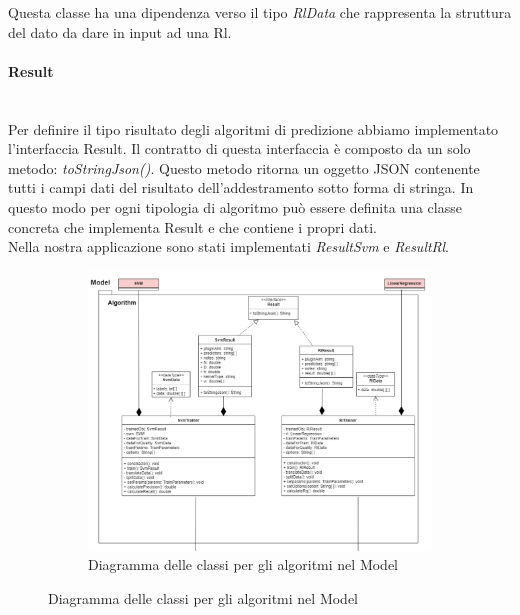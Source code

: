 		Questa classe ha una dipendenza verso il tipo \textit{RlData} che rappresenta la struttura del dato da dare in input ad una Rl\glo.
		\paragraph*{Result} \mbox{} \\[1mm]
		Per definire il tipo risultato degli algoritmi di predizione abbiamo implementato l'interfaccia Result. Il contratto di questa interfaccia è composto da un solo metodo: \textit{toStringJson()}. Questo metodo ritorna un oggetto JSON contenente tutti i campi dati del risultato dell'addestramento sotto forma di stringa. In questo modo per ogni tipologia di algoritmo può essere definita una classe concreta che implementa Result e che contiene i propri dati. \\
		Nella nostra applicazione sono stati implementati \textit{ResultSvm} e \textit{ResultRl}.
		\mbox{}
		\begin{landscape}
			\begin{figure}
				\begin{figure} [H]
					\includegraphics[width=180mm]{img/Diagrammi/algorithm-app.png}
					\caption{Diagramma delle classi per gli algoritmi nel Model}
				\end{figure}
			\end{figure}
		\end{landscape}
